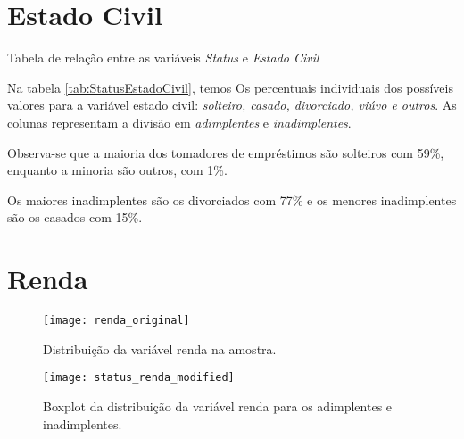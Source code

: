 \section{Estado Civil}

\begin{table}[h]
\centering

\caption{\label{tab:StatusEstadoCivil}Tabela de relação entre as variáveis \emph{Status
}e \emph{Estado Civil}}
\end{table}

Na tabela \ref{tab:StatusEstadoCivil}, temos Os percentuais individuais dos possíveis valores para a variável estado civil: \emph{solteiro, casado, divorciado, viúvo e outros}. As colunas representam a divisão em \emph{adimplentes} e \emph{inadimplentes}.

Observa-se que a maioria dos tomadores de empréstimos são solteiros com 59\%, enquanto a minoria são outros, com 1\%.

Os maiores inadimplentes são os divorciados com 77\% e os menores inadimplentes são os casados com 15\%.

\section{Renda}

\begin{center}
\begin{figure}
\begin{centering}
\texttt{[image: renda\_original]}
\par\end{centering}
\caption{\label{fig:RendaOriginal}Distribuição da variável renda na amostra.}
\end{figure}
\vspace*{-40pt}
\par\end{center}

\begin{center}
\begin{figure}
\begin{centering}
\texttt{[image: status\_renda\_modified]}
\par\end{centering}
\caption{\label{fig:StatusRendaMod}Boxplot da distribuição da variável renda para os adimplentes e inadimplentes.}
\end{figure}
\vspace*{-40pt}
\par\end{center}

